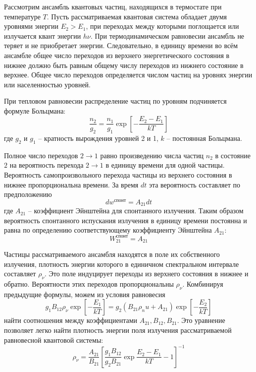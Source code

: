 
Рассмотрим ансамбль квантовых частиц, находящихся в термостате при 
температуре \( T \). Пусть рассматриваемая квантовая система обладает двумя 
уровнями энергии \( E_2 > E_1 \), при переходах между которыми поглощается 
или излучается квант энергии \( h\nu \). При термодинамическом равновесии 
ансамбль не теряет и не приобретает энергии. Следовательно, в единицу времени 
во всём ансамбле общее число переходов из верхнего энергетического состояния 
в нижнее должно быть равным общему числу переходов из нижнего состояние в 
верхнее. Общее число переходов определяется числом частиц на уровнях энергии 
или населенностью уровней. 

При тепловом равновесии распределение частиц по уровням подчиняется формуле 
Больцмана:
\[
	\frac{n_2}{g_2} = \frac{n_1}{g_1}\exp
		\left[ -\frac{E_2 - E_1}{kT}\right]
\]
где \( g_2 \) и \( g_1 \) -- кратность вырождения уровней 2 и 1, 
\( k \) -- постоянная Больцмана.

Полное число переходов \( 2 \rightarrow 1 \) равно произведению числа частиц 
\( n_2 \) в состояние \( 2 \) на вероятность перехода \( 2 \rightarrow 1 \) 
в единицу времени для одной частицы. Вероятность самопроизвольного перехода 
частицы из верхнего состояния в нижнее пропорциональна времени. За время 
\( dt \) эта вероятность составляет по предположению
\[
	dw^\text{спонт} = A_{21} dt
\]
где \( A_{21} \) -- коэффициент Эйнштейна для спонтанного излучения. Таким 
образом вероятность спонтанного испускания излучения в единицу времени 
постоянна и равна по определению соответствующему коэффициенту Эйнштейна 
\( A_{21} \):
\[
	W_{21}^\text{спонт} = A_{21}
\]

Частицы рассматриваемого ансамбля находятся в поле их собственного излучения, 
плотность энергии которого в единичном спектральном интервале составляет 
\( \rho_\nu \). Это поле индуцирует переходы из верхнего состояния в нижнее 
и обратно. Вероятности этих переходов пропорциональны \( \rho_\nu \). 
Комбинируя предыдущие формулы, можем из условия равновесия
\[
	g_1 B_{12} \rho_\nu \exp\left[ -\frac{E_1}{kT} \right] = 
	g_2 \left( B_{21}\rho_nu + A_{21} \right)
		\exp\left[ -\frac{E_2}{kT} \right]
\]
найти соотношения между коэффициентами \( A_{21}, B_{12}, B_{21} \). Это 
уравнение позволяет легко найти плотность энергии поля излучения 
рассматриваемой равновесной квантовой системы:
\[
	\rho_\nu = \frac{A_{21}}{B_{21}}
		\left[ 
			\frac{g_1 B_{12}}{g_2 B_{21}}\exp\frac{E_2 - E_1}{kT} - 1 
		\right]^{-1}
\]

